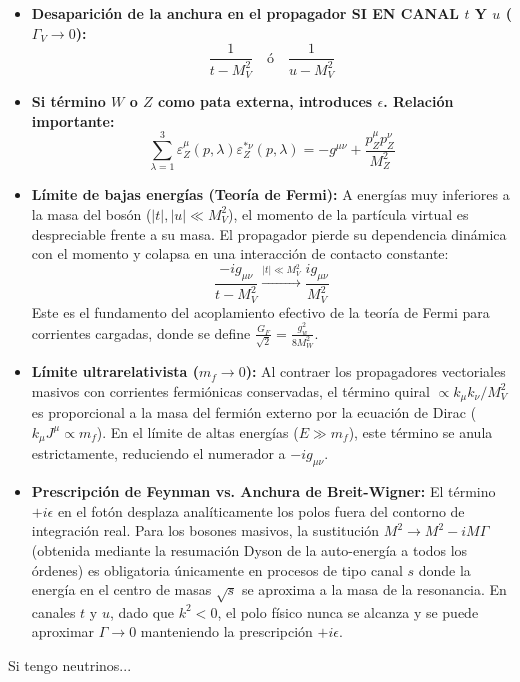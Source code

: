 \begin{itemize}
    \item \textbf{\color{red}Desaparición de la anchura en el propagador SI EN CANAL $t$ Y $u$ ($\Gamma_V \to 0$):} 
    \[ \frac{1}{t - M_V^2} \quad \text{ó} \quad \frac{1}{u - M_V^2} \]

    \item \textbf{Si término $W$ o $Z$ como pata externa, introduces $\epsilon$. Relación importante:}
    $$\sum_{\lambda=1}^3 \varepsilon_Z^\mu(p, \lambda) \varepsilon_Z^{*\nu}(p, \lambda) = -g^{\mu\nu} + \frac{p_Z^\mu p_Z^\nu}{M_Z^2}$$


    \item \textbf{Límite de bajas energías (Teoría de Fermi):} A energías muy inferiores a la masa del bosón ($|t|, |u| \ll M_V^2$), el momento de la partícula virtual es despreciable frente a su masa. El propagador pierde su dependencia dinámica con el momento y colapsa en una interacción de contacto constante:
    \[ \frac{-i g_{\mu\nu}}{t - M_V^2} \xrightarrow{|t| \ll M_V^2} \frac{i g_{\mu\nu}}{M_V^2} \]
    Este es el fundamento del acoplamiento efectivo de la teoría de Fermi para corrientes cargadas, donde se define $\frac{G_F}{\sqrt{2}} = \frac{g_w^2}{8M_W^2}$.

    \item \textbf{Límite ultrarelativista ($m_f \to 0$):} Al contraer los propagadores vectoriales masivos con corrientes fermiónicas conservadas, el término quiral $\propto k_\mu k_\nu / M_V^2$ es proporcional a la masa del fermión externo por la ecuación de Dirac ($k_\mu J^\mu \propto m_f$). En el límite de altas energías ($E \gg m_f$), este término se anula estrictamente, reduciendo el numerador a $-i g_{\mu\nu}$.
    \item \textbf{Prescripción de Feynman vs. Anchura de Breit-Wigner:} El término $+i\epsilon$ en el fotón desplaza analíticamente los polos fuera del contorno de integración real. Para los bosones masivos, la sustitución $M^2 \to M^2 - iM\Gamma$ (obtenida mediante la resumación Dyson de la auto-energía a todos los órdenes) es obligatoria únicamente en procesos de tipo canal $s$ donde la energía en el centro de masas $\sqrt{s}$ se aproxima a la masa de la resonancia. En canales $t$ y $u$, dado que $k^2 < 0$, el polo físico nunca se alcanza y se puede aproximar $\Gamma \to 0$ manteniendo la prescripción $+i\epsilon$.
\end{itemize}

Si tengo neutrinos...


